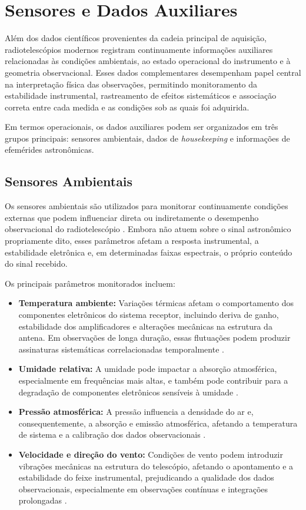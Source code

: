 \section{Sensores e Dados Auxiliares}

Além dos dados científicos provenientes da cadeia principal de aquisição, radiotelescópios modernos registram continuamente informações auxiliares relacionadas às condições ambientais, ao estado operacional do instrumento e à geometria observacional. Esses dados complementares desempenham papel central na interpretação física das observações, permitindo monitoramento da estabilidade instrumental, rastreamento de efeitos sistemáticos e associação correta entre cada medida e as condições sob as quais foi adquirida.

Em termos operacionais, os dados auxiliares podem ser organizados em três grupos principais: sensores ambientais, dados de \textit{housekeeping} e informações de efemérides astronômicas.

\subsection{Sensores Ambientais}

Os sensores ambientais são utilizados para monitorar continuamente condições externas que podem influenciar direta ou indiretamente o desempenho observacional do radiotelescópio \cite{itu2013radioastronomy}. Embora não atuem sobre o sinal astronômico propriamente dito, esses parâmetros afetam a resposta instrumental, a estabilidade eletrônica e, em determinadas faixas espectrais, o próprio conteúdo do sinal recebido.

Os principais parâmetros monitorados incluem:

\begin{itemize}
\item \textbf{Temperatura ambiente:} Variações térmicas afetam o comportamento dos componentes eletrônicos do sistema receptor, incluindo deriva de ganho, estabilidade dos amplificadores e alterações mecânicas na estrutura da antena. Em observações de longa duração, essas flutuações podem produzir assinaturas sistemáticas correlacionadas temporalmente \cite{wilson2013tools,thompson2017interferometry}.
\item \textbf{Umidade relativa:} A umidade pode impactar a absorção atmosférica, especialmente em frequências mais altas, e também pode contribuir para a degradação de componentes eletrônicos sensíveis à umidade \cite{kraus1986radio,wilson2013tools}.
\item \textbf{Pressão atmosférica:} A pressão influencia a densidade do ar e, consequentemente, a absorção e emissão atmosférica, afetando a temperatura de sistema e a calibração dos dados observacionais \cite{kraus1986radio,thompson2017interferometry}.
\item \textbf{Velocidade e direção do vento:} Condições de vento podem introduzir vibrações mecânicas na estrutura do telescópio, afetando o apontamento e a estabilidade do feixe instrumental, prejudicando a qualidade dos dados observacionais, especialmente em observações contínuas e integrações prolongadas \cite{thompson2017interferometry,GBTog2011_green}.
\end{itemize}

